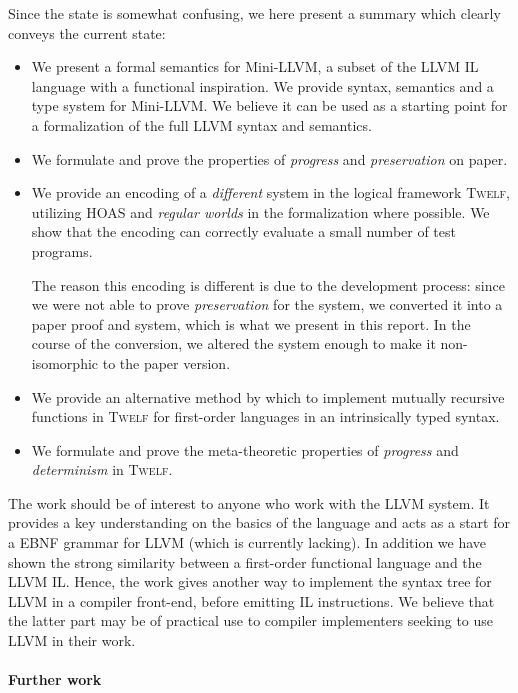 \documentclass[a4paper, oneside, 10pt, final]{memoir}
\newcommand{\twelf}{\textsc{Twelf}}
\begin{document}
Since the state is somewhat confusing, we here present a summary which
clearly conveys the current state:
\begin{itemize}
\item We present a formal semantics for Mini-LLVM, a subset of the
  LLVM IL language with a functional inspiration. We provide syntax,
  semantics and a type system for Mini-LLVM. We believe it can be used
  as a starting point for a formalization of the full LLVM syntax and
  semantics.
\item We formulate and prove the properties of \emph{progress} and
  \emph{preservation} on paper.
\item We provide an encoding of a \emph{different} system in the
  logical framework \twelf{}, utilizing HOAS and \emph{regular worlds}
  in the formalization where possible. We show that the encoding can
  correctly evaluate a small number of test programs.

  The reason this encoding is different is due to the development
  process: since we were not able to prove \emph{preservation} for the
  system, we converted it into a paper proof and system, which is what
  we present in this report. In the course of the conversion, we
  altered the system enough to make it non-isomorphic to the paper
  version.
\item We provide an alternative method by which to implement mutually
  recursive functions in \twelf{} for first-order languages in an
  intrinsically typed syntax.
\item We formulate and prove the meta-theoretic properties of
  \emph{progress} and \emph{determinism} in \twelf{}.
\end{itemize}

The work should be of interest to anyone who work with the LLVM
system. It provides a key understanding on the basics of the language
and acts as a start for a EBNF grammar for LLVM (which is currently
lacking). In addition we have shown the strong similarity between a
first-order functional language and the LLVM IL. Hence, the work gives
another way to implement the syntax tree for LLVM in a compiler
front-end, before emitting IL instructions. We believe that the latter
part may be of practical use to compiler implementers seeking to use
LLVM in their work.

\paragraph{Further work}
\end{document}

